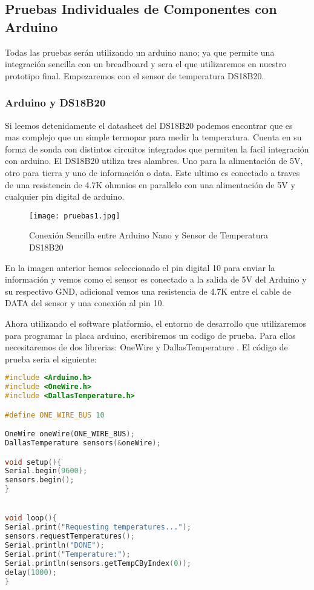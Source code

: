 \subsection{Pruebas Individuales de Componentes con Arduino }
\par \noindent
Todas las pruebas serán utilizando un arduino nano; ya que permite una integración sencilla con un breadboard y sera el que utilizaremos en nuestro prototipo final. Empezaremos con el sensor de temperatura DS18B20.

\subsubsection{Arduino y DS18B20}
\par 
Si leemos detenidamente el datasheet del DS18B20 podemos encontrar que es mas complejo que un simple termopar para medir la temperatura. Cuenta en su forma de sonda con distintos circuitos integrados que permiten la facil integración con arduino. El DS18B20 utiliza tres alambres. Uno para la alimentación de 5V, otro para tierra y uno de información o data. Este ultimo es conectado a traves de una resistencia de 4.7K ohmnios en parallelo con una alimentación de 5V y cualquier pin digital de arduino. 

\begin{figure}[H]
	\centering
	\texttt{[image: pruebas1.jpg]}
	\caption{Conexión Sencilla entre Arduino Nano y Sensor de Temperatura DS18B20}
\end{figure}

\par \noindent
En la imagen anterior hemos seleccionado el pin digital 10 para enviar la información y vemos como el sensor es conectado a la salida de 5V del Arduino y su respectivo GND, adicional vemos una resistencia de 4.7K entre el cable de DATA del sensor y una conexión al pin 10. 

\par \noindent
Ahora utilizando el software platformio, el entorno de desarrollo que utilizaremos para programar la placa arduino, escribiremos un codigo de prueba. Para ellos necesitaremos de dos librerias: OneWire \cite{onewire-github} y DallasTemperature \cite{dallas-github}. El código de prueba seria el siguiente: \\

\begin{lstlisting}[language=C++, caption={Codigo Ejemplo para DS18B20}, captionpos=b]
#include <Arduino.h>
#include <OneWire.h>
#include <DallasTemperature.h>

#define ONE_WIRE_BUS 10

OneWire oneWire(ONE_WIRE_BUS);
DallasTemperature sensors(&oneWire);

void setup(){
Serial.begin(9600);
sensors.begin();
}


void loop(){
Serial.print("Requesting temperatures...");
sensors.requestTemperatures(); 
Serial.println("DONE");
Serial.print("Temperature:");
Serial.println(sensors.getTempCByIndex(0));
delay(1000);
}
\end{lstlisting}

